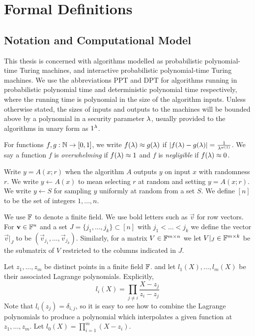 \chapter{Formal Definitions}
\label{chapterlabel:Definitions}

\section{Notation and Computational Model}

This thesis is concerned with algorithms modelled as probabilistic polynomial-time Turing machines, and interactive probabilistic polynomial-time Turing machines. We use the abbreviations PPT and DPT for algorithms running in probabilistic polynomial time and deterministic polynomial time respectively, where the running time is polynomial in the size of the algorithm inputs. Unless otherwise stated, the sizes of inputs and outputs to the machines will be bounded above by a polynomial in a security parameter $\lambda$, usually provided to the algorithms in unary form as $1^{\lambda}$.

For functions $f,g: \mathbb{N} \rightarrow [0,1] $, we write $f(\lambda)\approx g(\lambda) $ if 
$|f(\lambda) - g(\lambda)|= \frac{1}{\lambda^{\omega(1)}}$. We say a function $f$ is \emph{overwhelming} if 
$f(\lambda) \approx 1$ and $f$ is \emph{negligible} if $f(\lambda) \approx 0$.

Write $y=A(x;r)$ when the algorithm $A$ outputs $y$ on input $x$ with randomness $r$. We write $y \gets A(x)$ to mean selecting $r$ at random and setting $y=A(x;r)$. We write $y \gets S$ for sampling $y$ uniformly at random from a set $S$. We define $[n]$ to be the set of integers $1,\ldots,n$.

We use $\mathbb{F}$ to denote a finite field. We use bold letters such as $\vec{v}$ for row vectors. For $\mathbf{v}\in \mathbb{F}^n$ and a set $J=\{j_1,\dots, j_k\}\subset [n]$ with $j_1<\dots<j_k$ we define the vector $\vec{v}|_J$ to be $(\vec{v}_{j_1},\dots, \vec{v}_{j_k})$. Similarly, for a matrix $V\in \mathbb{F}^{m\times n}$ we let $V|_{J}\in \mathbb{F}^{m\times k}$ be the submatrix of $V$ restricted to the columns indicated in $J$.

Let $z_1,\ldots,z_m$ be distinct points in a finite field $\mathbb{F}$. and let $l_1(X),\ldots,l_m(X)$ be their associated Lagrange polynomials. Explicitly, $$l_i(X) = \prod_{j \neq i} \frac{X-z_j}{z_i - z_j}$$ Note that $l_i(z_j)=\delta_{i,j}$, so it is easy to see how to combine the Lagrange polynomials to produce a polynomial which interpolates a given function at $z_1, \ldots, z_m$. Let $l_0(X) = \prod_{i=1}^m (X-z_i)$. 


